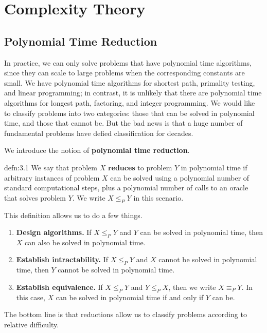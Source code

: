 \section{Complexity Theory}\label{sec:3}

\subsection{Polynomial Time Reduction}\label{subsec:3.1}
In practice, we can only solve problems that have polynomial time algorithms, 
since they can scale to large problems when the corresponding constants 
are small. We have polynomial time algorithms for shortest path, 
primality testing, and linear programming; in contrast, it is unlikely 
that there are polynomial time algorithms for longest path, factoring, 
and integer programming. We would like to classify problems into two 
categories: those that can be solved in polynomial time, and those that 
cannot be. But the bad news is that a huge number of fundamental 
problems have defied classification for decades. 

We introduce the notion of {\bf polynomial time reduction}.

\begin{defn}{defn:3.1}
    We say that problem $X$ {\bf reduces} to problem $Y$ in polynomial time if 
    arbitrary instances of problem $X$ can be solved using a polynomial number 
    of standard computational steps, plus a polynomial number of calls to 
    an oracle that solves problem $Y$. We write $X \leq_P Y$ in this scenario. 
\end{defn}

This definition allows us to do a few things. 
\begin{enumerate}[(1)]
    \item {\bf Design algorithms.} If $X \leq_P Y$ and $Y$ can be solved in 
    polynomial time, then $X$ can also be solved in polynomial time. 
    \item {\bf Establish intractability.} If $X \leq_P Y$ and $X$ cannot be 
    solved in polynomial time, then $Y$ cannot be solved in polynomial time. 
    \item {\bf Establish equivalence.} If $X \leq_P Y$ and $Y \leq_P X$, then 
    we write $X \equiv_P Y$. In this case, $X$ can be solved in polynomial 
    time if and only if $Y$ can be. 
\end{enumerate}
The bottom line is that reductions allow us to classify problems according 
to relative difficulty. 

